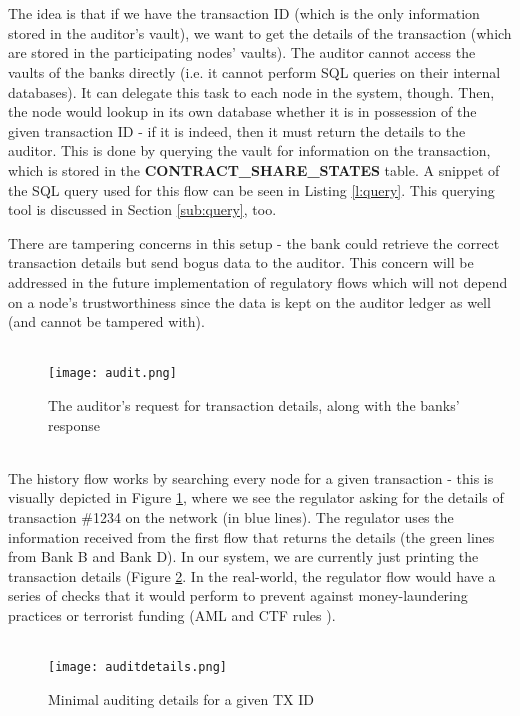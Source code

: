\documentclass[12pt,twoside]{article}
\begin{document}
\\ \\
The idea is that if we have the transaction ID (which is the only information stored in the auditor's vault), we want to get the details of the transaction (which are stored in the participating nodes' vaults). The auditor cannot access the vaults of the banks directly (i.e. it cannot perform SQL queries on their internal databases). It can delegate this task to each node in the system, though. Then, the node would lookup in its own database whether it is in possession of the given transaction ID - if it is indeed, then it must return the details to the auditor. This is done by querying the vault for information on the transaction, which is stored in the \textbf{CONTRACT\_SHARE\_STATES} table. A snippet of the SQL query used for this flow can be seen in Listing \ref{l:query}. This querying tool is discussed in Section \ref{sub:query}, too.

There are tampering concerns in this setup - the bank could retrieve the correct transaction details but send bogus data to the auditor. This concern will be addressed in the future implementation of regulatory flows which will not depend on a node's trustworthiness since the data is kept on the auditor ledger as well (and cannot be tampered with). 
\\ \\
\begin{figure}[!htb]
\centering
\texttt{[image: audit.png]}
\caption{The auditor's request for transaction details, along with the banks' response}
\centering
\label{fig:audit}
\end{figure}
\\
The history flow works by searching every node for a given transaction - this is visually depicted in Figure \ref{fig:audit}, where we see the regulator asking for the details of transaction \#1234 on the network (in blue lines). The regulator uses the information received from the first flow that returns the details (the green lines from Bank B and Bank D). In our system, we are currently just printing the transaction details (Figure \ref{fig:auditdetails}. In the real-world, the regulator flow would have a series of checks that it would perform to prevent against money-laundering practices or terrorist funding (AML and CTF rules \cite{amlctf}).
\\ \\
\begin{figure}[!htb]
\centering
\texttt{[image: auditdetails.png]}
\caption{Minimal auditing details for a given TX ID}
\centering
\label{fig:auditdetails}
\end{figure}
\end{document}
